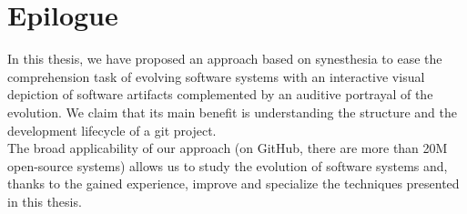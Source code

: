 \section{Epilogue}
In this thesis, we have proposed an approach based on synesthesia to ease the comprehension task of evolving software systems with an interactive visual depiction of software artifacts complemented by an auditive portrayal of the evolution. We claim that its main benefit is understanding the structure and the development lifecycle of a git project. \\
The broad applicability of our approach  (on GitHub, there are more than 20M open-source systems) allows us to study the evolution of software systems and, thanks to the gained experience, improve and specialize the techniques presented in this thesis.  